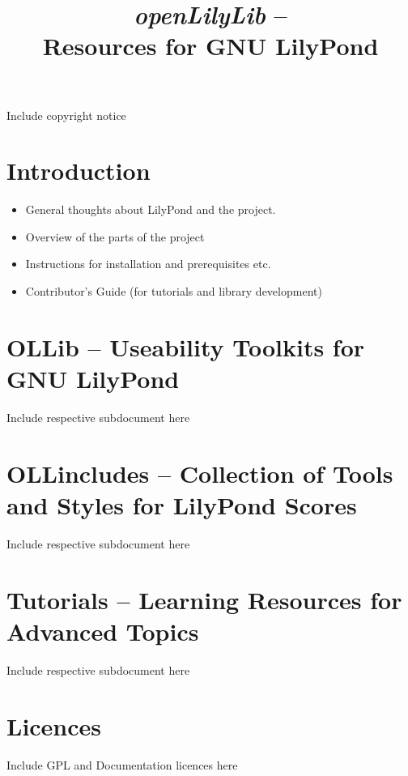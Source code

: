 \documentclass{OLLbook}
\begin{document}
\title{\textit{openLilyLib} -- \\
	Resources for GNU LilyPond}

\maketitle

Include copyright notice

\tableofcontents

\part{Introduction}

\begin{itemize}
\item General thoughts about LilyPond and the project.
\item Overview of the parts of the project
\item Instructions for installation and prerequisites etc.
\item Contributor's Guide (for tutorials and library development)
\end{itemize}


\part{OLLib -- Useability Toolkits for GNU LilyPond}

Include respective subdocument here

\part{OLLincludes -- Collection of Tools and Styles for LilyPond Scores}

Include respective subdocument here

\part{Tutorials -- Learning Resources for Advanced Topics}

Include respective subdocument here

\part{Licences}

Include GPL and Documentation licences here
\end{document}
